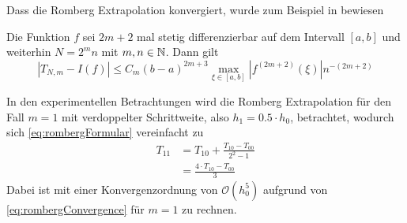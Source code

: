Dass die Romberg Extrapolation konvergiert, wurde zum Beispiel in \cite{von1993short} bewiesen 
\begin{theorem}\label{thm:rombergConvergence}
 Die Funktion $f$ sei $2m+2$ mal stetig differenzierbar auf dem Intervall $[a,b]$ und weiterhin $N=2^mn$ mit $m,n\in \mathbb{N}$. Dann gilt
 \begin{equation}\label{eq:rombergConvergence}
  |T_{N,m} - I(f)| \leq C_m(b-a)^{2m+3}\max_{\xi \in[a,b]}|f^{(2m+2)}(\xi)|n^{-(2m+2)}
 \end{equation}
\end{theorem}

In den experimentellen Betrachtungen wird die Romberg Extrapolation für den Fall $m=1$ mit verdoppelter Schrittweite, also $h_1=0.5\cdot h_0$, betrachtet, wodurch sich \eqref{eq:rombergFormular} vereinfacht zu
\[
\begin{aligned}
 T_{11} &= T_{10} + \frac{T_{10}-T_{00}}{2^2-1}\\
	  &= \frac{4\cdot T_{10}-T_{00}}{3}
 \end{aligned}
\]
Dabei ist mit einer Konvergenzordnung von $\mathcal O(h_0^5)$ aufgrund von \eqref{eq:rombergConvergence} für $m=1$ zu rechnen.

